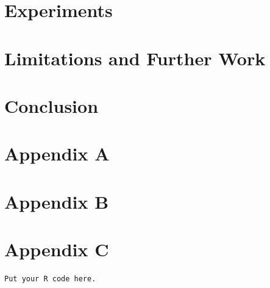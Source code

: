 \documentclass[a4paper,12pt]{article}
\theoremstyle{remark}
\begin{document}
\section{Experiments}
\label{sec:experiments}

\section{Limitations and Further Work}
\label{sec:limitations}

\section{Conclusion}
\label{sec:conclusion}


\clearpage








\printbibliography




\appendix
\section{Appendix A}
\label{app:AppendixA}
\section{Appendix B}
\label{app:AppendixB}
\section{Appendix C}
\label{app:AppendixC}
\begin{verbatim}
Put your R code here.
\end{verbatim}
\end{document}

